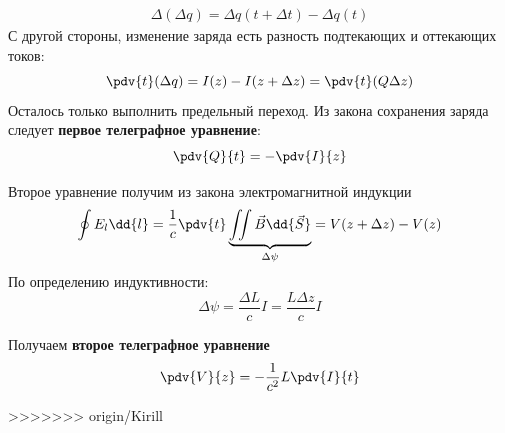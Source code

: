 \begin{gather}
	\Delta(\Delta q) = \Delta q(t + \Delta t) - \Delta q(t)
\end{gather}
С другой стороны, изменение заряда есть разность подтекающих и оттекающих токов:
\begin{equation}
	\pdv{t} (\Delta q )= I(z)-I(z+ \Delta z)= \pdv{t} (Q \Delta z)
\end{equation}
Осталось только выполнить предельный переход.  Из закона сохранения заряда следует \textbf{первое телеграфное уравнение}:
\begin{equation}
	\pdv{Q}{t}= - \pdv{I}{z}
\end{equation}

Второе уравнение получим из закона электромагнитной индукции
\begin{equation}
	\oint E_l \dd{l}= \frac{1}{c} \pdv{t} \underbrace{\iint  \vec B \dd{\vec S}}_{\Delta \psi} = V(z+ \Delta z) - V(z)
\end{equation}
По определению индуктивности:
\begin{equation}
	\Delta \psi = \frac{\Delta L}{c} I = \frac{L \Delta z}{c} I
\end{equation}

Получаем \textbf{второе телеграфное уравнение}
\begin{equation}
	\pdv{V}{z} = - \frac{1}{c^2} L \pdv{I}{t}
\end{equation}

>>>>>>> origin/Kirill

